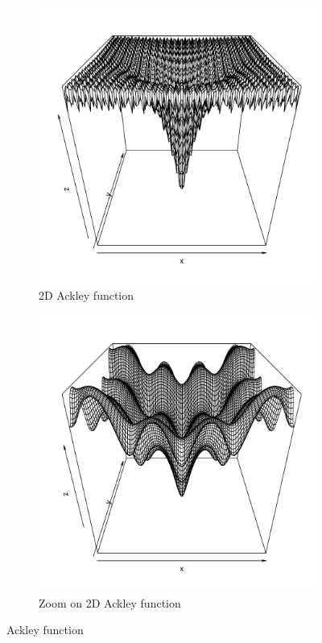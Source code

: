 \documentclass [PhD] {package/uclathes}
\begin{document}
\begin{figure}%
\captionsetup[subfigure]{labelformat=empty}
\centering
\begin{subfigure}[b]{0.4\textwidth}
\centering
\includegraphics[width=\textwidth]{chapters/EGO/pdfs/ackley2}
\caption{2D Ackley function}
\end{subfigure}
\hfill
\begin{subfigure}[b]{0.4\textwidth}
\centering
\includegraphics[width=\textwidth]{chapters/EGO/pdfs/ackley2zoom}
\caption{Zoom on 2D Ackley function}
\end{subfigure}
\caption{Ackley function}
\end{figure}
\end{document}
